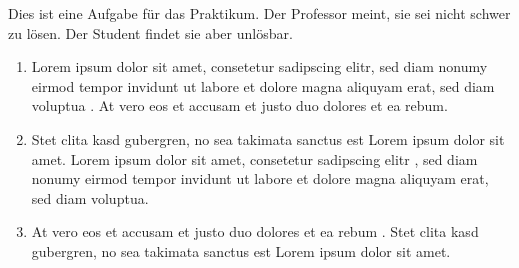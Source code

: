 Dies ist eine Aufgabe für das Praktikum.
Der Professor meint, sie sei nicht schwer zu lösen.
Der Student findet sie aber unlösbar.
\begin{enumerate}
\item Lorem ipsum dolor sit amet, consetetur sadipscing elitr, sed diam nonumy eirmod tempor invidunt ut labore et dolore magna aliquyam erat, sed diam voluptua . At vero eos et accusam et justo duo dolores et ea rebum. 
\item Stet clita kasd gubergren, no sea takimata sanctus est Lorem ipsum dolor sit amet. Lorem ipsum dolor sit amet, consetetur sadipscing elitr , sed diam nonumy eirmod tempor invidunt ut labore et dolore magna aliquyam erat, sed diam voluptua. 
\item At vero eos et accusam et justo duo dolores et ea rebum . Stet clita kasd gubergren, no sea takimata sanctus est Lorem ipsum dolor sit amet. 
\end{enumerate}
